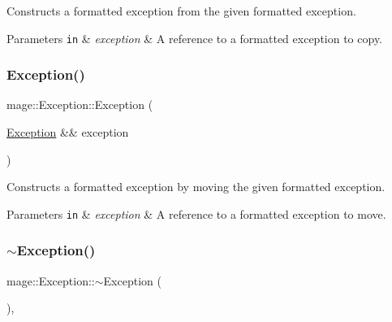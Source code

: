 Constructs a formatted exception from the given formatted exception.


\begin{DoxyParams}[1]{Parameters}
\mbox{\tt in}  & {\em exception} & A reference to a formatted exception to copy. \\
\hline
\end{DoxyParams}
\hypertarget{classmage_1_1_exception_a5a745eb8921cb986c822c0f95455314a}{}\label{classmage_1_1_exception_a5a745eb8921cb986c822c0f95455314a} 
\subsubsection{\texorpdfstring{Exception()}{Exception()}\hspace{0.1cm}{\footnotesize\ttfamily [5/5]}}
{\footnotesize\ttfamily mage\+::\+Exception\+::\+Exception (\begin{DoxyParamCaption}\item[{\hyperlink{classmage_1_1_exception}{Exception} \&\&}]{exception }\end{DoxyParamCaption})\hspace{0.3cm}{\ttfamily [default]}}

Constructs a formatted exception by moving the given formatted exception.


\begin{DoxyParams}[1]{Parameters}
\mbox{\tt in}  & {\em exception} & A reference to a formatted exception to move. \\
\hline
\end{DoxyParams}
\hypertarget{classmage_1_1_exception_a088e91ba8dffd31a9d6aa7d4af2ee2c0}{}\label{classmage_1_1_exception_a088e91ba8dffd31a9d6aa7d4af2ee2c0} 
\subsubsection{\texorpdfstring{$\sim$\+Exception()}{~Exception()}}
{\footnotesize\ttfamily mage\+::\+Exception\+::$\sim$\+Exception (\begin{DoxyParamCaption}{ }\end{DoxyParamCaption})\hspace{0.3cm}{\ttfamily [virtual]}, {\ttfamily [default]}}

